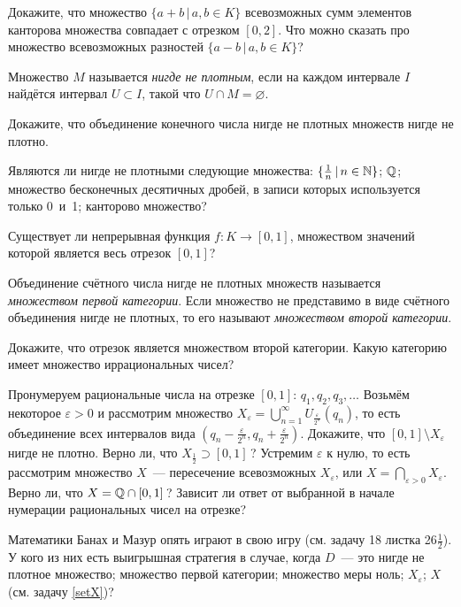 \documentclass[a4paper, 11pt]{article}
\begin{document}
Докажите, что множество $\{a+b\,|\,a,b\in K\}$ всевозможных
сумм элементов канторова множества совпадает с отрезком $[0,2]$.
Что можно сказать про множество всевозможных разностей
$\{a-b\,|\,a,b\in K\}$?

Множество $M$ называется \emph{нигде не плотным}, если на каждом
интервале $I$ найдётся интервал $U\subset I$,
такой что $U\cap M=\varnothing$.

Докажите, что объединение конечного числа
нигде не плотных множеств нигде не плотно.

Являются ли нигде не плотными следующие множества:
$\{\frac1n\,|\,n\in\mathbb{N}\}$;
$\mathbb{Q}$;
множество бесконечных десятичных дробей, в записи которых
используется только 0~и~1;
канторово множество?

Существует ли непрерывная функция $f\colon K\to[0,1]$, множеством значений
которой является весь отрезок $[0,1]$?

Объединение счётного числа нигде не плотных множеств
называется \emph{множеством первой категории}.
Если множество не представимо в виде счётного объединения
нигде не плотных, то его называют
\emph{множеством второй категории}.

Докажите, что отрезок является множеством второй категории.
Какую категорию имеет множество иррациональных чисел?

\label{setX}
Пронумеруем рациональные числа на отрезке $[0,1]$: $q_1, q_2, q_3,\dots$
Возьмём некоторое $\varepsilon>0$ и рассмотрим множество
$X_\varepsilon=\bigcup\limits_{n=1}^{\infty}U_{\frac{\varepsilon}{2^n}}(q_n)$,
то есть объединение всех интервалов вида
$(q_n-\frac{\varepsilon}{2^n},q_n+\frac{\varepsilon}{2^n})$.
Докажите, что $[0,1]\setminus X_\varepsilon$ нигде не плотно.
Верно ли, что $X_{\frac12}\supset[0,1]$\,?
Устремим $\varepsilon$ к нулю, то есть рассмотрим множество $X$~---
пересечение всевозможных $X_\varepsilon$, или
$X=\bigcap\limits_{\varepsilon>0}X_\varepsilon$.
Верно ли, что $X=\mathbb{Q}\cap[0,1]$\,? Зависит ли ответ от выбранной
в начале нумерации рациональных чисел на отрезке?

Математики Банах и Мазур опять играют в свою игру (см. задачу 18
листка 26$\frac12$). У кого из них есть
выигрышная стратегия в случае, когда $D$~--- это
нигде не плотное множество;
множество первой категории;
множество меры ноль;
$X_{\varepsilon}$;
$X$ (см. задачу \ref{setX})?
\end{document}
